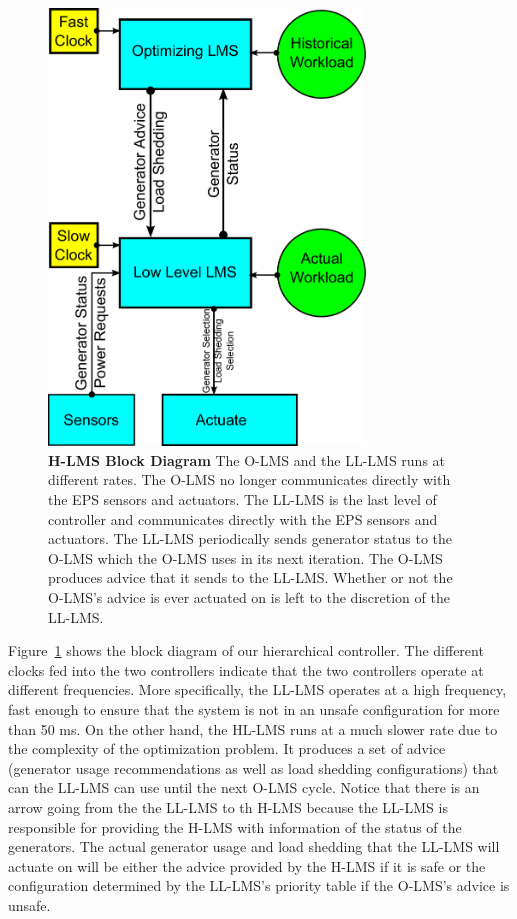 \documentclass{acm_proc_article-sp}
\begin{document}
\begin{figure}[hp]
  \centering
  \includegraphics[width=0.75\textwidth]{figures/H-LMS.pdf}
  \caption{\textbf{H-LMS Block Diagram} The O-LMS and the LL-LMS runs at different rates. The O-LMS no longer communicates directly with the EPS sensors
and actuators. The LL-LMS is the last level of controller and communicates directly with the EPS sensors and actuators. The LL-LMS periodically sends
generator status to the O-LMS which the O-LMS uses in its next iteration. The O-LMS produces advice that it sends to the LL-LMS. Whether or not the O-LMS's
advice is ever actuated on is left to the discretion of the LL-LMS.}
  \label{fig:H-LMS}
\end{figure}

Figure~\ref{fig:H-LMS} shows the block diagram of our hierarchical controller. The different clocks fed into the two controllers indicate that the two
controllers operate at different frequencies. More specifically, the LL-LMS operates at a high frequency, fast enough to ensure that the system is not
in an unsafe configuration for more than 50 ms. On the other hand, the HL-LMS runs at a much slower rate due to the complexity of the optimization problem.
It produces a set of advice (generator usage recommendations as well as load shedding configurations) that can the LL-LMS can use until the next O-LMS 
cycle. Notice that there is an arrow going from the the LL-LMS to th H-LMS because the LL-LMS is responsible for providing the H-LMS with information of
the status of the generators. The actual generator usage and load shedding that the LL-LMS will actuate on will be either the advice provided by the H-LMS
if it is safe or the configuration determined by the LL-LMS's priority table if the O-LMS's advice is unsafe.
\end{document}
